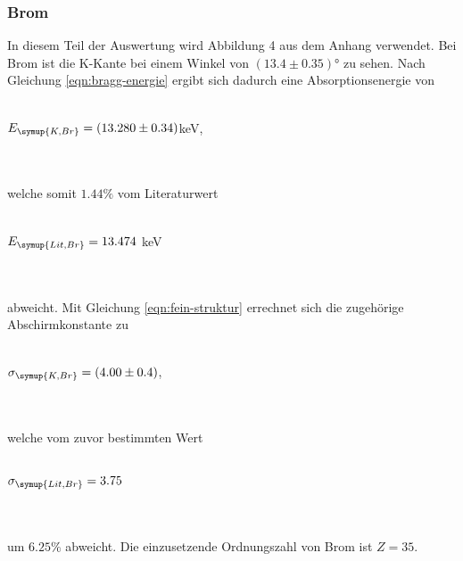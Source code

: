         \subsubsection{Brom}
            In diesem Teil der Auswertung wird Abbildung 4 aus dem Anhang verwendet.
            Bei Brom ist die K-Kante bei einem Winkel von $(13.4 \pm 0.35)°$ zu sehen. Nach 
            Gleichung \eqref{eqn:bragg-energie} ergibt sich dadurch eine Absorptionsenergie
            von 
            \\ \\
            \centerline{$E_{\symup{K, Br}} = (13.280 \pm 0.34)$keV,}
            \\ \\
            welche somit $1.44 \%$ vom Literaturwert
            \\ \\
            \centerline{$E_{\symup{Lit, Br}} = 13.474$ keV \cite{periodic}}
            \\ \\
            abweicht. Mit Gleichung \eqref{eqn:fein-struktur} errechnet sich die 
            zugehörige Abschirmkonstante zu 
            \\ \\
            \centerline{$\sigma_{\symup{K, Br}} = (4.00 \pm 0.4)$,}
            \\ \\
            welche vom zuvor bestimmten Wert
            \\ \\
            \centerline{$\sigma_{\symup{Lit, Br}} = 3.75$}
            \\ \\
            um $6.25 \%$ abweicht. Die einzusetzende Ordnungszahl von Brom 
            ist $Z = 35$.
